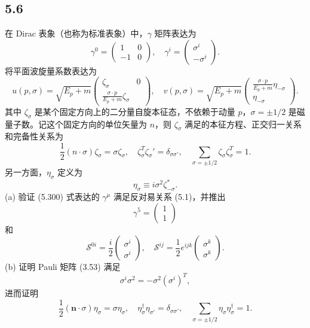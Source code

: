 \subsection{5.6}
在 Dirac 表象（也称为标准表象）中，$\gamma$ 矩阵表达为
$$\gamma^0 = 
\begin{pmatrix}
1 & 0 \\
-1 & 0
\end{pmatrix},
\quad \gamma^i = 
\begin{pmatrix}
\sigma^i \\
-\sigma^i
\end{pmatrix}.$$
将平面波旋量系数表达为
$$u(p, \sigma) = \sqrt{E_p + m} \begin{pmatrix}
\zeta_\sigma & 0 \\
\frac{\sigma \cdot p}{E_p + m} \zeta_\sigma
\end{pmatrix},
\quad v(p, \sigma) = \sqrt{E_p + m} \begin{pmatrix}
\frac{\sigma \cdot p}{E_p + m} \eta_{-\sigma} \\
\eta_{-\sigma}
\end{pmatrix}.$$
其中 $\zeta_\sigma$ 是某个固定方向上的二分量自旋本征态，不依赖于动量 $p$，$\sigma = \pm 1/2$ 是磁量子数。记这个固定方向的单位矢量为 $n$，则 $\zeta_\sigma$ 满足的本征方程、正交归一关系和完备性关系为
$$\frac{1}{2} (n \cdot \sigma) \zeta_\sigma = \sigma \zeta_\sigma,
\quad \zeta_\sigma^T \zeta_\sigma' = \delta_{\sigma \sigma'},
\quad \sum_{\sigma = \pm 1/2} \zeta_\sigma \zeta_\sigma^T = 1.$$
另一方面，$\eta_\sigma$ 定义为
$$\eta_\sigma \equiv i \sigma^2 \zeta_{-\sigma}^*.$$
(a) 验证 (5.300) 式表达的 $\gamma^\mu$ 满足反对易关系 (5.1)，并推出
$$\gamma^5 = \begin{pmatrix}
1 \\
1
\end{pmatrix} \tag{5.304}$$
和
$$\mathcal{S}^{0i} = \frac{i}{2} \begin{pmatrix}
\sigma^i \\
\sigma^i
\end{pmatrix}, \quad \mathcal{S}^{ij} = \frac{1}{2} e^{ijk} \begin{pmatrix}
\sigma^k \\
\sigma^k
\end{pmatrix}. \tag{5.305}$$
(b) 证明 Pauli 矩阵 (3.53) 满足
$$\sigma^i \sigma^2 = -\sigma^2 (\sigma^i)^T, \tag{5.306}$$
进而证明
$$\frac{1}{2} (\mathbf{n} \cdot \sigma) \eta_\sigma = \sigma \eta_\sigma, \quad \eta_\sigma^{\dagger} \eta_{\sigma'} = \delta_{\sigma \sigma'}, \quad \sum_{\sigma = \pm 1/2} \eta_\sigma \eta_\sigma^{\dagger} = 1. \tag{5.307}$$
